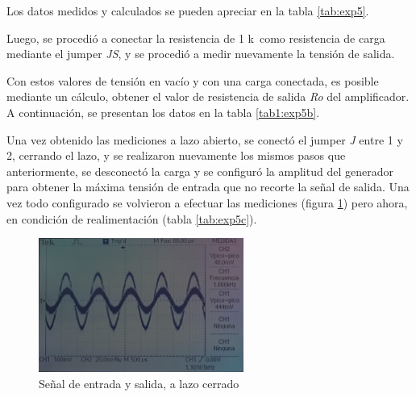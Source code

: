 Los datos medidos y calculados se pueden apreciar en la tabla \ref{tab:exp5}.

\begin{table}[H]
    \centering
        \def\tablename{Tabla} 
        \caption{Valores medidos de tensión y ganancia calculada}
        \label{tab:exp5}
\end{table}

Luego, se procedió a conectar la resistencia de 1 k\ohm ~como resistencia de carga mediante el jumper \textit{JS}, y se procedió a medir nuevamente la tensión de salida. 

Con estos valores de tensión en vacío y con una carga conectada, es posible mediante un cálculo, obtener el valor de resistencia de salida \textit{Ro} del amplificador. A continuación, se presentan los datos en la tabla \ref{tab1:exp5b}.

\begin{table}[H]
    \centering
        \def\tablename{Tabla} 
        \caption{Valores de tensión medidos y resistencia calculada}
        \label{tab1:exp5b}
\end{table}


Una vez obtenido las mediciones a lazo abierto, se conectó el jumper \textit{J} entre 1 y 2, cerrando el lazo, y se realizaron nuevamente los mismos pasos que anteriormente, se desconectó la carga y se configuró la amplitud del generador para obtener la máxima tensión de entrada que no recorte la señal de salida. Una vez todo configurado se volvieron a efectuar las mediciones (figura \ref{fig:amp2LC}) pero ahora, en condición de realimentación (tabla \ref{tab:exp5c}). 

\begin{figure}[H]
    \centering
    \includegraphics[width=0.6\textwidth]{Imagenes/Amp2LC.jpeg}
    \caption{Señal de entrada y salida, a lazo cerrado}
    \label{fig:amp2LC}
\end{figure}


